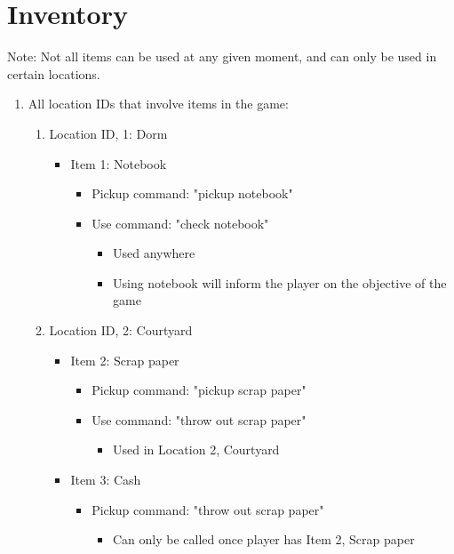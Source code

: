 \documentclass[11pt]{article}
\begin{document}
\section*{Inventory}
Note: Not all items can be used at any given moment, and can only be used in certain locations.\\
\begin{enumerate}
\item All location IDs that involve items in the game:
\begin{enumerate}
    \item Location ID, 1: Dorm
    \begin{itemize}
        \item Item 1: Notebook
        \begin{itemize}
            \item Pickup command: "pickup notebook"
            \item Use command: "check notebook"
            \begin{itemize}
                \item Used anywhere
                \item Using notebook will inform the player on the objective of the game
            \end{itemize}
        \end{itemize}
    \end{itemize}
    \item  Location ID, 2: Courtyard
    \begin{itemize}
        \item Item 2: Scrap paper
        \begin{itemize}
            \item Pickup command: "pickup scrap paper"
            \item Use command: "throw out scrap paper"
            \begin{itemize}
                \item Used in Location 2, Courtyard
            \end{itemize}
        \end{itemize}
        \item Item 3: Cash
        \begin{itemize}
            \item Pickup command: "throw out scrap paper"
                                                \begin{itemize}
                                                    \item Can only be called once player has Item 2, Scrap paper

\end{itemize}
\end{itemize}
\end{itemize}
\end{enumerate}
\end{enumerate}
\end{document}
